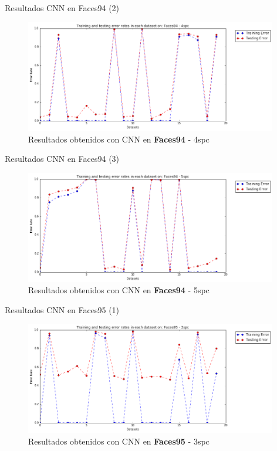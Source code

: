 \documentclass{beamer}
\begin{document}
\begin{frame}{Resultados CNN en Faces94 (2)}
\begin{figure}[htpb!]
\centering
\includegraphics[width=11cm]{convolution_5}
\caption{Resultados obtenidos con CNN en \textbf{Faces94} - 4spc}
\end{figure}
\end{frame}

\begin{frame}{Resultados CNN en Faces94 (3)}
\begin{figure}[htpb!]
\centering
\includegraphics[width=11cm]{convolution_6}
\caption{Resultados obtenidos con CNN en \textbf{Faces94} - 5spc}
\end{figure}
\end{frame}

\begin{frame}{Resultados CNN en Faces95 (1)}
\begin{figure}[htpb!]
\centering
\includegraphics[width=11cm]{convolution_7}
\caption{Resultados obtenidos con CNN en \textbf{Faces95} - 3spc}
\end{figure}
\end{frame}
\end{document}
